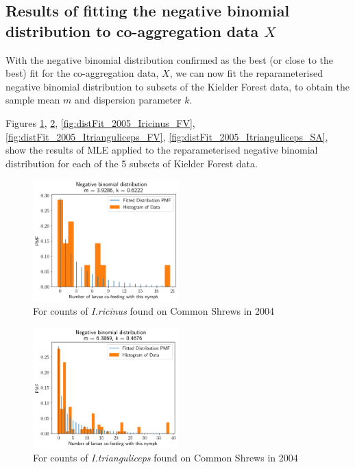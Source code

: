 \documentclass{article}
\begin{document}
\clearpage

\subsection{Results of fitting the negative binomial distribution to co-aggregation data \texorpdfstring{$ X $}{X}}

With the negative binomial distribution confirmed as the best (or close to the best) fit for the co-aggregation data, $ X $, we can now fit the reparameterised negative binomial distribution to subsets of the Kielder Forest data, to obtain the sample mean $ m $ and dispersion parameter $ k $.

Figures \ref{fig:distFit_2004_Iricinus_SA}, \ref{fig:distFit_2004_Itrianguliceps_SA}, \ref{fig:distFit_2005_Iricinus_FV}, \ref{fig:distFit_2005_Itrianguliceps_FV}, \ref{fig:distFit_2005_Itrianguliceps_SA}, show the results of MLE applied to the reparameterised negative binomial distribution for each of the 5 subsets of Kielder Forest data.

\begin{figure}[ht]
	\begin{mdframed}[backgroundcolor=grey250,rightline=false,leftline=false,topline=false]
	\includegraphics[width=0.5\textwidth, center]{coaggregation_dist_2004_I.ricinus_SA.png}
	\caption{For counts of \textit{I.ricinus} found on Common Shrews in 2004}\label{fig:distFit_2004_Iricinus_SA}
	\end{mdframed}
\end{figure}

\begin{figure}[ht]
	\begin{mdframed}[backgroundcolor=grey250,rightline=false,leftline=false,topline=false]
	\includegraphics[width=0.5\textwidth, center]{coaggregation_dist_2004_I.trianguliceps_SA.png}
	\caption{For counts of \textit{I.trianguliceps} found on Common Shrews in 2004}\label{fig:distFit_2004_Itrianguliceps_SA}
	\end{mdframed}
\end{figure}
\end{document}
